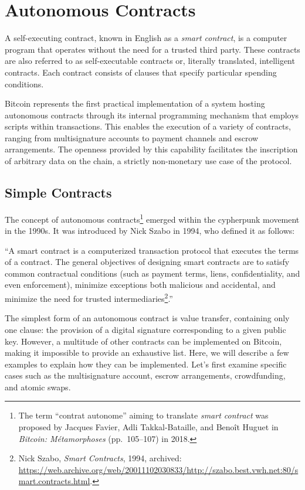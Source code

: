 \documentclass[
  a5paper,
  smalldemyvopaper,10pt,twoside,onecolumn,openright,extrafontsizes,hidelinks]{memoir}
\begin{document}

\chapter{Autonomous Contracts}\label{ch:contracts}

A self-executing contract, known in English as a \emph{smart contract},
is a computer program that operates without the need for a trusted third
party. These contracts are also referred to as self-executable contracts
or, literally translated, intelligent contracts. Each contract consists
of clauses that specify particular spending conditions.

Bitcoin represents the first practical implementation of a system
hosting autonomous contracts through its internal programming mechanism
that employs scripts within transactions. This enables the execution of
a variety of contracts, ranging from multisignature accounts to payment
channels and escrow arrangements. The openness provided by this
capability facilitates the inscription of arbitrary data on the chain, a
strictly non-monetary use case of the protocol.

\section*{Simple Contracts}\label{simple-contracts}


The concept of autonomous contracts\footnote{The term ``contrat
  autonome'' aiming to translate \emph{smart contract} was proposed by
  Jacques Favier, Adli Takkal-Bataille, and Benoît Huguet in
  \emph{Bitcoin: Métamorphoses} (pp.~105--107) in 2018.} emerged within
the cypherpunk movement in the 1990s. It was introduced by Nick Szabo in
1994, who defined it as follows:

``A smart contract is a computerized transaction protocol that executes
the terms of a contract. The general objectives of designing smart
contracts are to satisfy common contractual conditions (such as payment
terms, liens, confidentiality, and even enforcement), minimize
exceptions both malicious and accidental, and minimize the need for
trusted intermediaries\footnote{Nick Szabo, \emph{Smart Contracts},
  1994, archived:
  \url{https://web.archive.org/web/20011102030833/http://szabo.best.vwh.net:80/smart.contracts.html}.}.''

The simplest form of an autonomous contract is value transfer,
containing only one clause: the provision of a digital signature
corresponding to a given public key. However, a multitude of other
contracts can be implemented on Bitcoin, making it impossible to provide
an exhaustive list. Here, we will describe a few examples to explain how
they can be implemented. Let's first examine specific cases such as the
multisignature account, escrow arrangements, crowdfunding, and atomic
swaps.
\end{document}
